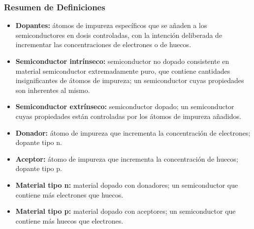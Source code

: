 \documentclass[10pt,t,aspectratio=169]{beamer}
\begin{document}
\begin{frame}[t]
  \frametitle{Resumen de Definiciones}

  \begin{itemize}
    \item \textbf{Dopantes:} átomos de impureza específicos que se añaden a los semiconductores en dosis controladas, con la intención deliberada de incrementar las concentraciones de electrones o de huecos.
    \item \textbf{Semiconductor intrínseco:} semiconductor no dopado consistente en material semiconductor extremadamente puro, que contiene cantidades insignificantes de átomos de impureza; un semiconductor cuyas propiedades son inherentes al mismo.
    \item \textbf{Semiconductor extrínseco:} semiconductor dopado; un semiconductor cuyas propiedades están controladas por los átomos de impureza añadidos.
    \item \textbf{Donador:} átomo de impureza que incrementa la concentración de electrones; dopante tipo n.
    \item \textbf{Aceptor:} átomo de impureza que incrementa la concentración de huecos; dopante tipo p.
    \item \textbf{Material tipo n:} material dopado con donadores; un semiconductor que contiene más electrones que huecos.
    \item \textbf{Material tipo p:} material dopado con aceptores; un semiconductor que contiene más huecos que electrones.
  \end{itemize}
\end{frame}
\end{document}

